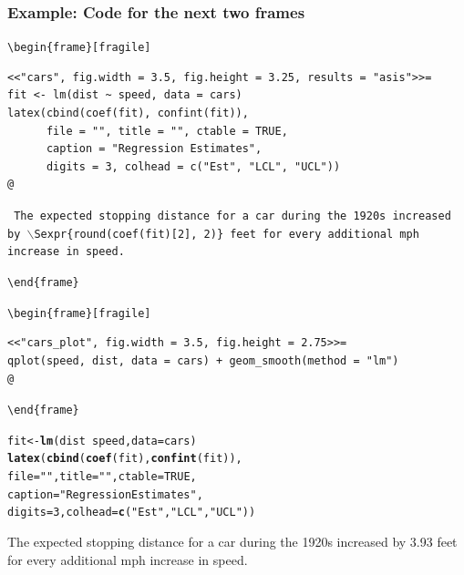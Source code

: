 \documentclass[t]{beamer}\usepackage[]{graphicx}\usepackage[]{color}
\makeatletter
\newcommand{\hlnum}[1]{\textcolor[rgb]{0.686,0.059,0.569}{#1}}%
\newcommand{\hlstr}[1]{\textcolor[rgb]{0.192,0.494,0.8}{#1}}%
\newcommand{\hlopt}[1]{\textcolor[rgb]{0,0,0}{#1}}%
\newcommand{\hlstd}[1]{\textcolor[rgb]{0.345,0.345,0.345}{#1}}%
\newcommand{\hlkwb}[1]{\textcolor[rgb]{0.69,0.353,0.396}{#1}}%
\newcommand{\hlkwc}[1]{\textcolor[rgb]{0.333,0.667,0.333}{#1}}%
\newcommand{\hlkwd}[1]{\textcolor[rgb]{0.737,0.353,0.396}{\textbf{#1}}}%
\newenvironment{kframe}{%
 \def\at@end@of@kframe{}%
 \ifinner\ifhmode%
  \def\at@end@of@kframe{\end{minipage}}%
  \begin{minipage}{\columnwidth}%
 \fi\fi%
 \def\FrameCommand##1{\hskip\@totalleftmargin \hskip-\fboxsep
 \colorbox{shadecolor}{##1}\hskip-\fboxsep
     \hskip-\linewidth \hskip-\@totalleftmargin \hskip\columnwidth}%
 \MakeFramed {\advance\hsize-\width
   \@totalleftmargin\z@ \linewidth\hsize
   \@setminipage}}%
 {\par\unskip\endMakeFramed%
 \at@end@of@kframe}
\makeatother
\begin{document}
\begin{frame}[fragile]
  \frametitle{Example: Code for the next two frames}
 
  \footnotesize
\verb;\begin{frame}[fragile];
\begin{verbatim}<<"cars", fig.width = 3.5, fig.height = 3.25, results = "asis">>=
fit <- lm(dist ~ speed, data = cars) 
latex(cbind(coef(fit), confint(fit)), 
      file = "", title = "", ctable = TRUE, 
      caption = "Regression Estimates", 
      digits = 3, colhead = c("Est", "LCL", "UCL"))
@ 
\end{verbatim}

{\tt 
The expected stopping distance for a car during the 1920s 
increased by $\backslash$Sexpr\{round(coef(fit)[2], 2)\} 
feet for every additional mph increase in speed.} 

\verb;\end{frame};

\verb;\begin{frame}[fragile];
  \begin{verbatim}<<"cars_plot", fig.width = 3.5, fig.height = 2.75>>=
qplot(speed, dist, data = cars) + geom_smooth(method = "lm")
@
\end{verbatim}
\verb;\end{frame};
\end{frame}

\begin{frame}[fragile]
\begin{kframe}
\begin{alltt}
\hlstd{fit} \hlkwb{<-} \hlkwd{lm}\hlstd{(dist} \hlopt{~} \hlstd{speed,} \hlkwc{data} \hlstd{= cars)}
\hlkwd{latex}\hlstd{(}\hlkwd{cbind}\hlstd{(}\hlkwd{coef}\hlstd{(fit),} \hlkwd{confint}\hlstd{(fit)),}
      \hlkwc{file} \hlstd{=} \hlstr{""}\hlstd{,} \hlkwc{title} \hlstd{=} \hlstr{""}\hlstd{,} \hlkwc{ctable} \hlstd{=} \hlnum{TRUE}\hlstd{,}
      \hlkwc{caption} \hlstd{=} \hlstr{"Regression Estimates"}\hlstd{,}
      \hlkwc{digits} \hlstd{=} \hlnum{3}\hlstd{,} \hlkwc{colhead} \hlstd{=} \hlkwd{c}\hlstd{(}\hlstr{"Est"}\hlstd{,} \hlstr{"LCL"}\hlstd{,} \hlstr{"UCL"}\hlstd{))}
\end{alltt}
\end{kframe}%
%


  The expected stopping distance for a car during the 1920s increased by
  3.93 feet for every additional mph increase in
  speed.
\end{frame}
\end{document}
